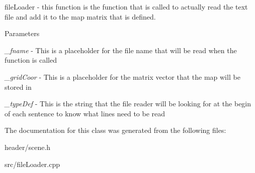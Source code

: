 fileLoader -\/ this function is the function that is called to actually read the text file and add it to the map matrix that is defined. 
\begin{DoxyParams}{Parameters}
\item[{\em \_\-fname}]-\/ This is a placeholder for the file name that will be read when the function is called \item[{\em \_\-gridCoor}]-\/ This is a placeholder for the matrix vector that the map will be stored in \item[{\em \_\-typeDef}]-\/ This is the string that the file reader will be looking for at the begin of each sentence to know what lines need to be read \end{DoxyParams}


The documentation for this class was generated from the following files:\begin{DoxyCompactItemize}
\item 
header/scene.h\item 
src/fileLoader.cpp\end{DoxyCompactItemize}
